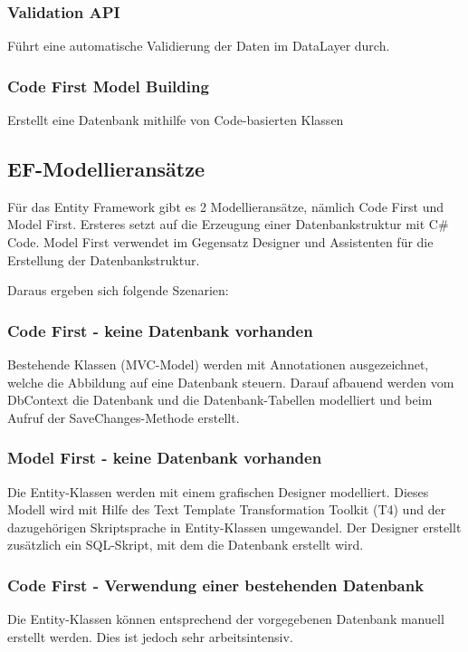 \subsubsection{Validation API}
Führt eine automatische Validierung der Daten im DataLayer durch.

\subsubsection{Code First Model Building}
Erstellt eine Datenbank mithilfe von Code-basierten Klassen

\subsection{EF-Modellieransätze}
Für das Entity Framework gibt es 2 Modellieransätze, nämlich Code First und Model First. Ersteres setzt auf die Erzeugung einer 
Datenbankstruktur mit C\# Code. Model First verwendet im Gegensatz Designer und Assistenten für die Erstellung der Datenbankstruktur.

Daraus ergeben sich folgende Szenarien:

\subsubsection{Code First - keine Datenbank vorhanden}
Bestehende Klassen (MVC-Model) werden mit Annotationen ausgezeichnet, welche die Abbildung auf eine Datenbank steuern.
Darauf afbauend werden vom DbContext die Datenbank und die Datenbank-Tabellen modelliert und beim Aufruf der SaveChanges-Methode erstellt.

\subsubsection{Model First - keine Datenbank vorhanden}
Die Entity-Klassen werden mit einem grafischen Designer modelliert. Dieses Modell wird mit Hilfe des Text Template Transformation Toolkit (T4) und 
der dazugehörigen Skriptsprache in Entity-Klassen umgewandel. Der Designer erstellt zusätzlich ein SQL-Skript, mit dem die Datenbank erstellt wird.

\subsubsection{Code First - Verwendung einer bestehenden Datenbank}
Die Entity-Klassen können entsprechend der vorgegebenen Datenbank manuell erstellt werden. Dies ist jedoch sehr arbeitsintensiv.

